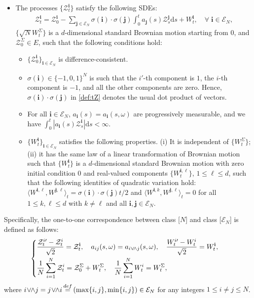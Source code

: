 \documentclass[12pt, twoside]{article}
\numberwithin{figure}{section}
\newcommand{\1}{\mathds 1}
\newcommand{\la}{{\langle}}
\newcommand{\ra}{{\rangle}}
\newcommand{\bs}{\boldsymbol}
\newcommand{\mc}{\mathcal}
\renewcommand{\d}{{\mathrm d}}
\newcommand{\2}{{\mathbf 1}}
\newcommand{\defeq}{{\stackrel{\rm def}{=}}}
\newcommand{\bi}{\mathbf i}
\newcommand{\bj}{\mathbf j}
\newcommand{\two}{{\sqrt{2}}}
\begin{document}
\begin{prop}
\begin{itemize}[leftmargin=1.2cm]
\item [{\bf [$ \mathbfcal{E}_{\bs N}$]}] The processes $\{\mc Z^\bi_t \}$ satisfy the following SDEs:
\begin{align}\label{def:tZ}
\mc Z^\bi_t=\mc Z^\bi_0-\sum_{\bj\in \mc E_N}\sigma(\bi)\cdot \sigma(\bj)\int_0^t a_\bj(s)\mc Z^\bj_s\d s+W^{\bi}_t,\quad \forall\;\bi\in \mc E_N,
\end{align}
$\{\sqrt{N}W^\Sigma_t \}$ is a $d$-dimensional standard Brownian motion starting from $0$, and $\mc Z^\Sigma_0\in E$, such that the following conditions hold:
\begin{itemize}
\item [$\bullet$] $\{\mc Z^\bi_0\}_{\bi\in \mc E_N}$ is difference-consistent.
\item [$\bullet$] $\sigma(\bi)\in \{-1,0,1\}^N$ is such that the $i\prime$-th component is $1$, the $i$-th component is $-1$, and all the other components are zero. Hence, $\sigma(\bi)\cdot\sigma(\bj)$ in \eqref{def:tZ} denotes the usual dot product of vectors.
\item [$\bullet$]  For all $\bi\in \mc E_N$, $a_{\bi}(s)=a_{\bi}(s,\omega)$ are progressively measurable, and we have $\int_0^t |a_{\bi}(s)\mc Z^\bi_s|\d s<\infty$.
\item [$\bullet$] $\{W^\bi_t \}_{\bi\in\mathcal E_N}$ satisfies the following properties. 
(i) It is independent of $\{W^\Sigma_t \}$; (ii) it has the same law of a linear transformation of Brownian motion such that $\{W^\bi_t \}$ is a $d$-dimensional standard Brownian motion with zero initial condition $0$ and real-valued components $\{W_t^{\bi,\ell}\}$, $1\leq \ell\leq d$, such that the following identities of quadratic variation hold:
$\la W^{\bi,\ell},W^{\bj,\ell}\ra_t=\sigma(\bi)\cdot \sigma(\bj)t/2$ and $
\la W^{\bi,k},W^{\bj,\ell}\ra_t=0$
for all $1\leq k, \ell\leq d$ with $k\neq \ell$ and all $\bi,\bj\in \mc E_N$.
\end{itemize}
\end{itemize}
Specifically, the one-to-one correspondence between class [$N$] and class [$\mathcal E_N$] is defined as follows: 
\begin{align}\label{def:bijective}
\begin{cases}
\displaystyle \frac{\mc Z_t^{i\prime}-\mc Z_t^i}{\two}=\mathcal Z_t^\bi,
\quad a_{ij}(s,\omega)=a_{i\vee\!\wedge j}(s,\omega),\quad \frac{W^{i\prime}_t-W^i_t}{\two}=W^{\bi}_t,\\
\vspace{-.4cm}\\
\displaystyle
\frac{1}{N}\sum_{i=1}^N \mc Z^i_t=\mc Z^\Sigma_0+W^\Sigma_t,\quad 
\frac{1}{N}\sum_{i=1}^N W^i_t=W^\Sigma_t,
\end{cases}
\end{align}
where $i\!\vee\!\!\wedge j=j\!\vee\!\!\wedge i\,\defeq\, 
(\max\{i,j\},\min\{i,j\})\in \mc E_N$ for any integers $1\leq i\neq j\leq N$.
\end{prop}
\end{document}
